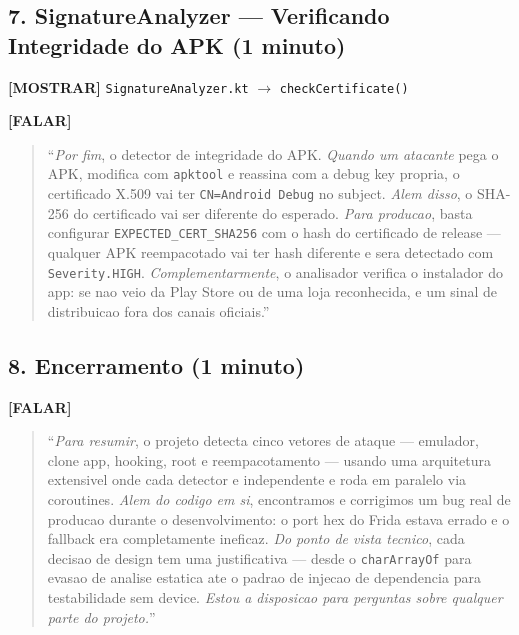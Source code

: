 \documentclass[12pt,a4paper]{article}
\begin{document}
\vspace{0.3cm}

\subsection*{7. SignatureAnalyzer --- Verificando Integridade do APK (1 minuto)}

\textbf{[MOSTRAR]} \texttt{SignatureAnalyzer.kt} $\to$ \texttt{checkCertificate()}

\textbf{[FALAR]}

\begin{quote}
``\textit{Por fim}, o detector de integridade do APK.
\textit{Quando um atacante} pega o APK, modifica com \texttt{apktool}
e reassina com a debug key propria, o certificado X.509 vai ter
\texttt{CN=Android Debug} no subject.
\textit{Alem disso}, o SHA-256 do certificado vai ser diferente do esperado.
\textit{Para producao}, basta configurar \texttt{EXPECTED\_CERT\_SHA256}
com o hash do certificado de release --- qualquer APK reempacotado
vai ter hash diferente e sera detectado com \texttt{Severity.HIGH}.
\textit{Complementarmente}, o analisador verifica o instalador do app:
se nao veio da Play Store ou de uma loja reconhecida,
e um sinal de distribuicao fora dos canais oficiais.''
\end{quote}

\vspace{0.3cm}

\subsection*{8. Encerramento (1 minuto)}

\textbf{[FALAR]}

\begin{quote}
``\textit{Para resumir}, o projeto detecta cinco vetores de ataque ---
emulador, clone app, hooking, root e reempacotamento ---
usando uma arquitetura extensivel onde cada detector e independente
e roda em paralelo via coroutines.
\textit{Alem do codigo em si}, encontramos e corrigimos um bug real
de producao durante o desenvolvimento: o port hex do Frida estava errado
e o fallback era completamente ineficaz.
\textit{Do ponto de vista tecnico}, cada decisao de design tem uma justificativa ---
desde o \texttt{charArrayOf} para evasao de analise estatica
ate o padrao de injecao de dependencia para testabilidade sem device.
\textit{Estou a disposicao para perguntas sobre qualquer parte do projeto.}''
\end{quote}
\end{document}
